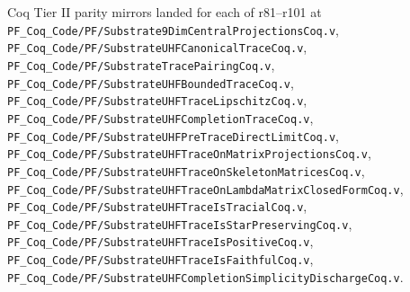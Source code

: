 \documentclass[11pt,a4paper]{amsart}
\theoremstyle{plain}
\theoremstyle{definition}
\begin{document}
Coq Tier II parity mirrors landed for each of r81--r101 at \texttt{PF\_Coq\_Code/PF/Substrate9DimCentralProjectionsCoq.v}, \texttt{PF\_Coq\_Code/PF/SubstrateUHFCanonicalTraceCoq.v}, \texttt{PF\_Coq\_Code/PF/SubstrateTracePairingCoq.v}, \texttt{PF\_Coq\_Code/PF/SubstrateUHFBoundedTraceCoq.v}, \texttt{PF\_Coq\_Code/PF/SubstrateUHFTraceLipschitzCoq.v}, \texttt{PF\_Coq\_Code/PF/SubstrateUHFCompletionTraceCoq.v}, \texttt{PF\_Coq\_Code/PF/SubstrateUHFPreTraceDirectLimitCoq.v}, \texttt{PF\_Coq\_Code/PF/SubstrateUHFTraceOnMatrixProjectionsCoq.v}, \texttt{PF\_Coq\_Code/PF/SubstrateUHFTraceOnSkeletonMatricesCoq.v}, \texttt{PF\_Coq\_Code/PF/SubstrateUHFTraceOnLambdaMatrixClosedFormCoq.v}, \texttt{PF\_Coq\_Code/PF/SubstrateUHFTraceIsTracialCoq.v}, \texttt{PF\_Coq\_Code/PF/SubstrateUHFTraceIsStarPreservingCoq.v}, \texttt{PF\_Coq\_Code/PF/SubstrateUHFTraceIsPositiveCoq.v}, \texttt{PF\_Coq\_Code/PF/SubstrateUHFTraceIsFaithfulCoq.v}, \texttt{PF\_Coq\_Code/PF/SubstrateUHFCompletionSimplicityDischargeCoq.v}.
\end{document}
